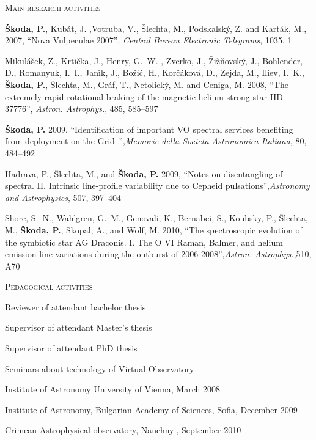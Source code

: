 \begin{cv}
\begin{cvlist}{\large \textsc{Main research activities}}
\item {\bf \v{S}koda, P.}, {Kub\'at}, J. ,{Votruba}, V., {\v{S}lechta}, M.,
	{Podskalsk\'y}, Z. and {Kart\'ak}, M., 2007, {``Nova Vulpeculae 2007''},
  {\em Central Bureau Electronic Telegrams}, 1035, 1

\item {{Mikul{\'a}{\v s}ek}, Z.,  {Krti{\v c}ka}, J., {Henry}, G.~W. 
, {Zverko}, J., {\v{Z}i{\v z}{\v n}ovsk{\'y}}, J., 
        {Bohlender}, D., {Romanyuk}, I.~I., {Jan{\'{\i}}k}, J., 
        {Bo{\v z}i{\'c}}, H., {Kor{\v c}{\'a}kov{\'a}}, D., {Zejda}, M., 
        {Iliev}, I.~K., {\bf {\v S}koda, P.}, {{\v S}lechta}, M.,
        {Gr{\'a}f}, T., {Netolick{\'y}}, M. and {Ceniga}, M.}
2008, {``The extremely rapid rotational braking of the magnetic helium-strong star HD 37776''}, 
{\em Astron. Astrophys.\/}, 485, 585--597


\item 
{\bf {\v S}koda, P.} 2009, {``Identification of important VO spectral services 
benefiting from deployment on the Grid .''},{\em Memorie della Societa 
Astronomica Italiana}, 80, 484--492

 
\item
{Hadrava, P., {\v S}lechta, M., and {\bf {\v S}koda, P.}} 2009, {``Notes on 
disentangling of spectra. II. Intrinsic line-profile variability due to 
Cepheid pulsations''},{\em Astronomy and Astrophysics}, 507, 397--404 


\item {Shore, S.~N., Wahlgren, G.~M., Genovali, K., Bernabei, S., Koubsky, P., 
{\v S}lechta, M., {\bf {\v S}koda, P.}, Skopal, A., and Wolf, M.} 2010, {``The 
spectroscopic evolution of the symbiotic star AG Draconis. I. The O VI 
Raman, Balmer, and helium emission line variations during the outburst of 
2006-2008''},{\em Astron. Astrophys.},510, A70 



\end{cvlist}

\noindent\hrulefill
\begin{cvlist}{\large \textsc{Pedagogical activities}} \addtolength{\itemsep}{-0.5\baselineskip}
\item Reviewer of attendant bachelor thesis
\item Supervisor of attendant Master's thesis
\item Supervisor of attendant PhD thesis
\item Seminars about technology of Virtual Observatory 
 \item \hspace{0.5cm} Institute of Astronomy University of Vienna, March 2008
\item \hspace{0.5cm} Institute of Astronomy, Bulgarian Academy of Sciences, Sofia, December 2009
\item\hspace{0.5cm}  Crimean Astrophysical observatory, Nauchnyi, September 2010
\end{cvlist}


\end{cv}
